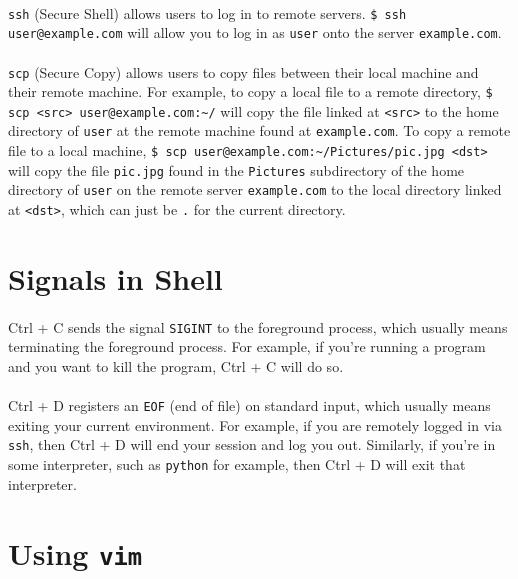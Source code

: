 \documentclass{article}
\begin{document}
\paragraph{} \texttt{ssh} (Secure Shell) allows users to log in to remote servers. \texttt{\$ ssh user@example.com} will allow you to log in as \texttt{user} onto the server \texttt{example.com}.

\paragraph{} \texttt{scp} (Secure Copy) allows users to copy files between their local machine and their remote machine. For example, to copy a local file to a remote directory, \texttt{\$ scp <src> user@example.com:\~\-/} will copy the file linked at \texttt{<src>} to the home directory of \texttt{user} at the remote machine found at \texttt{example.com}. To copy a remote file to a local machine, \texttt{\$ scp user@example.com:\~\-/Pictures/pic.jpg <dst>} will copy the file \texttt{pic.jpg} found in the \texttt{Pictures} subdirectory of the home directory of \texttt{user} on the remote server \texttt{example.com} to the local directory linked at \texttt{<dst>}, which can just be \texttt{.} for the current directory.

\section{Signals in Shell}

\paragraph{} Ctrl + C sends the signal \texttt{SIGINT} to the foreground process, which usually means terminating the foreground process. For example, if you're running a program and you want to kill the program, Ctrl + C will do so.

\paragraph{} Ctrl + D registers an \texttt{EOF} (end of file) on standard input, which usually means exiting your current environment. For example, if you are remotely logged in via \texttt{ssh}, then Ctrl + D will end your session and log you out. Similarly, if you're in some interpreter, such as \texttt{python} for example, then Ctrl + D will exit that interpreter.

\section{Using \texttt{vim}}
\end{document}

